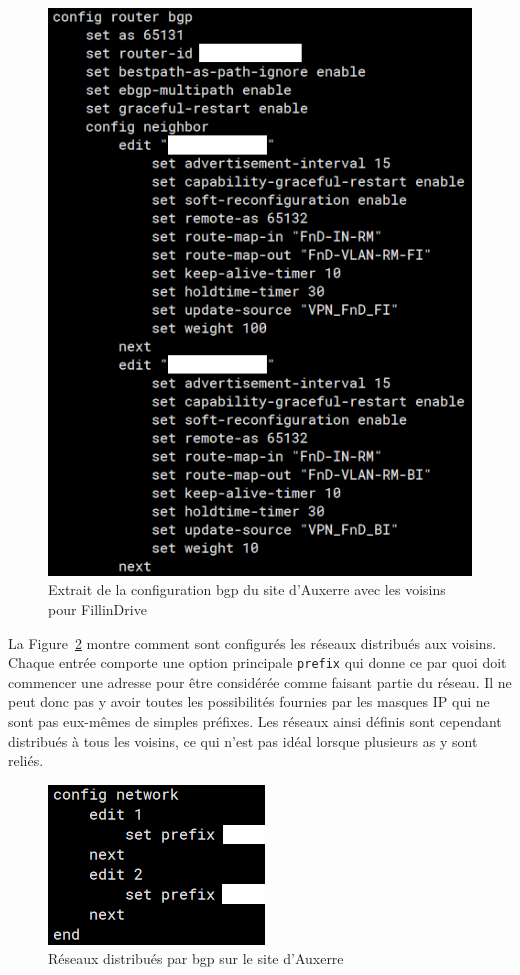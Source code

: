 \documentclass[12pt, oneside, a4paper, titlepage]{report}
\begin{document}
\begin{figure}[h!]
    \centering
    \includegraphics[width = 0.6\linewidth]{img/fgt-auxr/bgp-neighbors.png}
    \caption{%
        Extrait de la configuration \gls{bgp} du site d'Auxerre avec les voisins
        pour FillinDrive%
    }%
    \label{fig:fgt-auxr/bgp-neighbors}
\end{figure}

La Figure~\ref{fig:fgt-auxr/bgp-nets} montre comment sont configurés les réseaux
distribués aux voisins. Chaque entrée comporte une option principale
\texttt{prefix} qui donne ce par quoi doit commencer une adresse pour être
considérée comme faisant partie du réseau. Il ne peut donc pas y avoir toutes
les possibilités fournies par les masques IP qui ne sont pas eux-mêmes de
simples préfixes. Les réseaux ainsi définis sont cependant distribués à tous les
voisins, ce qui n'est pas idéal lorsque plusieurs \gls{as} y sont reliés.

\begin{figure}[h!]
    \centering
    \includegraphics[width = 0.4\linewidth]{img/fgt-auxr/bgp-nets.png}
    \caption{Réseaux distribués par \gls{bgp} sur le site d'Auxerre}%
    \label{fig:fgt-auxr/bgp-nets}
\end{figure}
\end{document}
